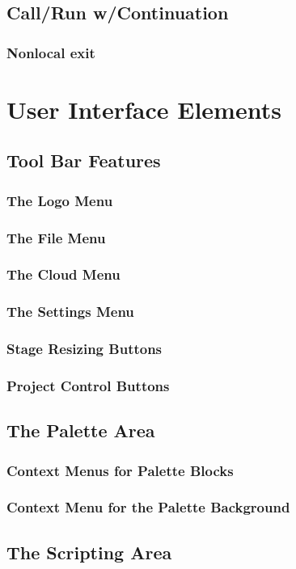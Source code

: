 \documentclass[a4paper]{report}
\begin{document}
\section{Call/Run w/Continuation}
\subsection{Nonlocal exit}
\chapter{User Interface Elements}
\section{Tool Bar Features}
\subsection{The \Snap{} Logo Menu}
\subsection{The File Menu}
\subsection{The Cloud Menu}
\subsection{The Settings Menu}
\subsection{Stage Resizing Buttons}
\subsection{Project Control Buttons}
\section{The Palette Area}
\subsection{Context Menus for Palette Blocks}
\subsection{Context Menu for the Palette Background}
\section{The Scripting Area}
\end{document}
